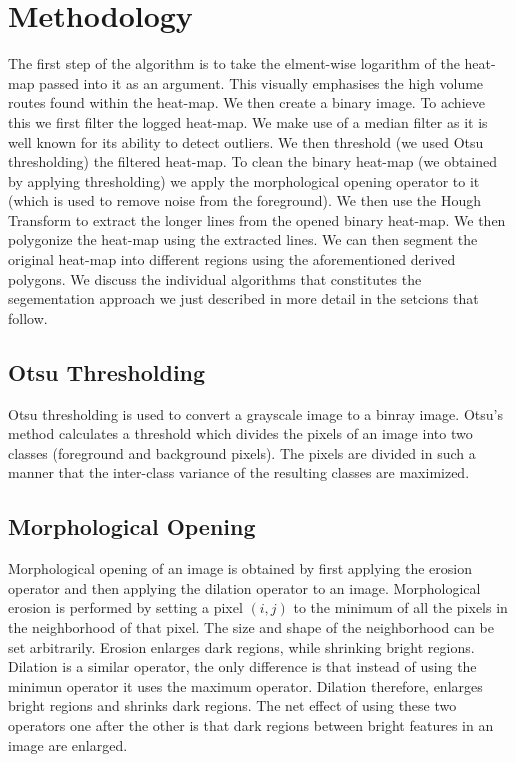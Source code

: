 \documentclass{article}
\begin{document}
\section{Methodology}
The first step of the algorithm is to take the elment-wise logarithm of the heat-map passed into it as an argument. This visually emphasises the high volume routes found within the heat-map. We then 
create a binary image. To achieve this we first filter the logged heat-map. We make use of a median filter as it is well known for its ability to detect outliers. We then threshold (we used Otsu thresholding) the  
filtered heat-map. To clean the binary heat-map (we obtained by applying thresholding) we apply the morphological opening operator to it (which is used to remove noise from the foreground).
We then use the Hough Transform to extract the longer lines from the opened binary heat-map. We then polygonize the heat-map using the extracted lines. We can then 
segment the original heat-map into different regions using the aforementioned derived polygons. We discuss the individual algorithms that constitutes the segementation approach we 
just described in more detail in the setcions that follow.

\subsection{Otsu Thresholding}
Otsu thresholding is used to convert a grayscale image to a binray image. Otsu's method calculates a threshold which divides 
the pixels of an image into two classes (foreground and background pixels). The pixels are divided in such a manner that the inter-class variance 
of the resulting classes are maximized. 

\subsection{Morphological Opening}
Morphological opening of an image is obtained by first applying the erosion operator and then applying the dilation operator to an image. 
Morphological erosion is performed by setting a pixel $(i,j)$ to the minimum of all the pixels in the neighborhood of that pixel. The size 
and shape of the neighborhood can be set arbitrarily. Erosion enlarges dark regions, while shrinking bright regions. Dilation is a similar operator,
the only difference is that instead of using the minimun operator it uses the maximum operator. Dilation therefore, enlarges bright regions and shrinks dark regions.
The net effect of using these two operators one after the other is that dark regions between bright features in an image are enlarged. 
\end{document}
